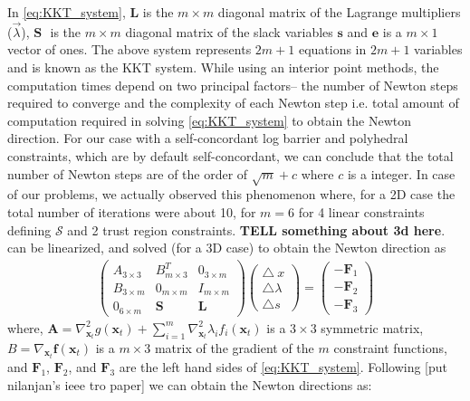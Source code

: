 \documentclass[12pt,a4]{article}
\begin{document}
In \cref{eq:KKT_system}, $\textbf{L}$ is the $m \times m$ diagonal matrix of the Lagrange multipliers ($\vec{\lambda}$), $\textbf{S }$ is the $m \times m$ diagonal matrix of the slack variables $\textbf{s}$ and $\textbf{e}$ is a $m\times 1$ vector of ones. The above system represents $2m+1$ equations in $2m+1$ variables and is known as the KKT system. While using an interior point methods, the computation times depend on two principal factors-- the number of Newton steps required to converge and the complexity of each Newton step i.e. total amount of computation required in solving \cref{eq:KKT_system} to obtain the Newton direction. For our case with  a self-concordant log barrier and polyhedral constraints, which are by default self-concordant, we can conclude that the total number of Newton steps are of the order of $\sqrt{m}+c$ where $c$ is a integer. In case of our problems, we actually observed this phenomenon where, for a 2D case the total number of iterations were about 10, for $m=6$ for 4 linear constraints defining $\mathcal{S}$ and 2 trust region constraints. \textbf{TELL something about 3d here}.\\
 can be linearized, and solved (for a 3D case) to obtain the Newton direction as
\begin{align}\label{eq:Lin_KKT}
\left(\begin{array}{ccc}
 A_{3\times3} & B^T_{m\times 3} & 0_{3\times m} \\ 
B_{3\times m}  & 0_{m\times m} & I_{m\times m} \\ 
0_{6\times m} & \textbf{S} & \textbf{L}
\end{array}  \right) \left( \begin{array}{c}
\triangle\ x \\ 
\triangle \lambda \\ 
 \triangle s
\end{array}  \right) = \left( \begin{array}{c}
-\textbf{F}_1 \\ 
-\textbf{F}_2 \\ 
-\textbf{F}_3
\end{array}  \right) 
\end{align}
where, $\textbf{A}=\nabla_{\textbf{x}_t}^2g(\textbf{x}_t)+\sum\limits_{i=1}^{m}\nabla_{\textbf{x}_t}^2\lambda_if_i(\textbf{x}_t)$ is a $3\times3$ symmetric matrix, $B=\nabla_{\textbf{x}_t}\textbf{f}(\textbf{x}_t)$ is a $m\times3$ matrix of the gradient of the $m$ constraint functions, and $\textbf{F}_1$, $\textbf{F}_2$, and $\textbf{F}_3$ are the left hand sides of \cref{eq:KKT_system}. Following [put nilanjan's ieee tro paper] we can obtain the Newton directions as:
\end{document}
